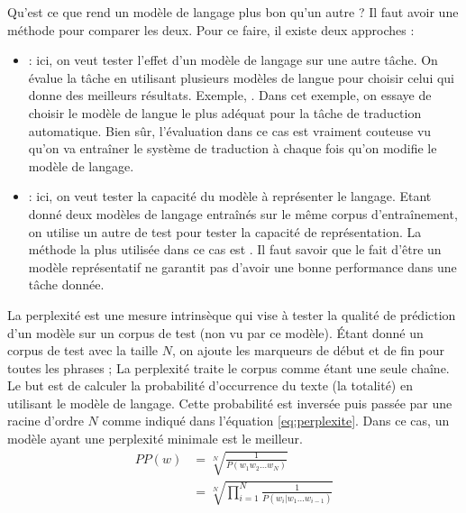 \documentclass{KodeBook}
\begin{document}
Qu'est ce que rend un modèle de langage plus bon qu'un autre ? 
Il faut avoir une méthode pour comparer les deux. 
Pour ce faire, il existe deux approches : 
	\begin{itemize}
		\item {} : ici, on veut tester l'effet d'un modèle de langage sur une autre tâche. 
		On évalue la tâche en utilisant plusieurs modèles de langue pour choisir celui qui donne des meilleurs résultats.
		Exemple, . 
		Dans cet exemple, on essaye de choisir le modèle de langue le plus adéquat pour la tâche de traduction automatique.
		Bien sûr, l'évaluation dans ce cas est vraiment couteuse vu qu'on va entraîner le système de traduction à chaque fois qu'on modifie le modèle de langage.
		
		\item {} : ici, on veut tester la capacité du modèle à représenter le langage. 
		Etant donné deux modèles de langage entraînés sur le même corpus d'entraînement, on utilise un autre de test pour tester la capacité de représentation.
		La méthode la plus utilisée dans ce cas est .
		Il faut savoir que le fait d'être un modèle représentatif ne garantit pas d'avoir une bonne performance dans une tâche donnée.
	\end{itemize}


La perplexité est une mesure intrinsèque qui vise à tester la qualité de prédiction d'un modèle sur un corpus de test (non vu par ce modèle). 
Étant donné un corpus de test avec la taille $N$, on ajoute les marqueurs de début et de fin pour toutes les phrases ; La perplexité traite le corpus comme étant une seule chaîne. 
Le but est de calculer la probabilité d'occurrence du texte (la totalité) en utilisant le modèle de langage. 
Cette probabilité est inversée puis passée par une racine d'ordre $N$ comme indiqué dans l'équation \ref{eq:perplexite}.
Dans ce cas, un modèle ayant une perplexité minimale est le meilleur.
%
\begin{align}
	PP(w) & = \sqrt[N]{\frac{1}{P(w_1 w_2 \ldots w_N)}} \nonumber\\
	 & = \sqrt[N]{\prod\limits_{i=1}^{N}\frac{1}{P(w_i | w_1 \ldots w_{i-1})}} \label{eq:perplexite}
\end{align}
\end{document}
